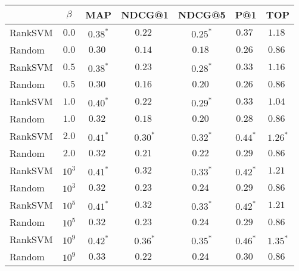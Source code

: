 \begin{tabular}{@{}lcccccc@{}}
  \toprule
    & $\beta$ & MAP & NDCG@1 & NDCG@5 & P@1 & TOP \\ \midrule
RankSVM & $0.0$ & $0.38^*$ & $0.22\;$ & $0.25^*$ & $0.37\;$ & $1.18\;$\\
Random & $0.0$ & $0.30\;$ & $0.14\;$ & $0.18\;$ & $0.26\;$ & $0.86\;$\\ \midrule
RankSVM & $0.5$ & $0.38^*$ & $0.23\;$ & $0.28^*$ & $0.33\;$ & $1.16\;$\\
Random & $0.5$ & $0.30\;$ & $0.16\;$ & $0.20\;$ & $0.26\;$ & $0.86\;$\\ \midrule
RankSVM & $1.0$ & $0.40^*$ & $0.22\;$ & $0.29^*$ & $0.33\;$ & $1.04\;$\\
Random & $1.0$ & $0.32\;$ & $0.18\;$ & $0.20\;$ & $0.28\;$ & $0.86\;$\\ \midrule
RankSVM & $2.0$ & $0.41^*$ & $0.30^*$ & $0.32^*$ & $0.44^*$ & $1.26^*$\\
Random & $2.0$ & $0.32\;$ & $0.21\;$ & $0.22\;$ & $0.29\;$ & $0.86\;$\\ \midrule
RankSVM & $10^3$ & $0.41^*$ & $0.32\;$ & $0.33^*$ & $0.42^*$ & $1.21\;$\\
Random & $10^3$ & $0.32\;$ & $0.23\;$ & $0.24\;$ & $0.29\;$ & $0.86\;$\\ \midrule
RankSVM & $10^5$ & $0.41^*$ & $0.32\;$ & $0.33^*$ & $0.42^*$ & $1.21\;$\\
Random & $10^5$ & $0.32\;$ & $0.23\;$ & $0.24\;$ & $0.29\;$ & $0.86\;$\\ \midrule
RankSVM & $10^9$ & $0.42^*$ & $0.36^*$ & $0.35^*$ & $0.46^*$ & $1.35^*$\\
Random & $10^9$ & $0.33\;$ & $0.22\;$ & $0.24\;$ & $0.30\;$ & $0.86\;$\\
\bottomrule
\end{tabular}

